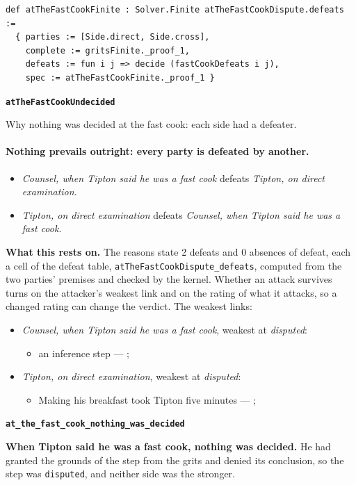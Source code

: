 \documentclass[11pt]{article}
\begin{document}
{\small\begin{verbatim}
def atTheFastCookFinite : Solver.Finite atTheFastCookDispute.defeats :=
  { parties := [Side.direct, Side.cross],
    complete := gritsFinite._proof_1,
    defeats := fun i j => decide (fastCookDefeats i j),
    spec := atTheFastCookFinite._proof_1 }
\end{verbatim}}
\par\medskip\noindent\textbf{\texttt{at\allowbreak{}The\allowbreak{}Fast\allowbreak{}Cook\allowbreak{}Undecided}}\par\nobreak\noindent
Why nothing was decided at the fast cook: each side had a defeater.

\paragraph{Nothing prevails outright: every party is defeated by another.}
\begin{itemize}
\item \emph{Counsel, when Tipton said he was a fast cook} defeats \emph{Tipton, on direct examination}.
\item \emph{Tipton, on direct examination} defeats \emph{Counsel, when Tipton said he was a fast cook}.
\end{itemize}
\par\noindent\textbf{What this rests on.} The reasons state 2 defeats and 0 absences of defeat, each a cell of the defeat table, \texttt{at\allowbreak{}The\allowbreak{}Fast\allowbreak{}Cook\allowbreak{}Dispute\_\allowbreak{}defeats}, computed from the two parties' premises and checked by the kernel. Whether an attack survives turns on the attacker's weakest link and on the rating of what it attacks, so a changed rating can change the verdict. The weakest links:
\begin{itemize}
\item \emph{Counsel, when Tipton said he was a fast cook}, weakest at \emph{disputed}:
\begin{itemize}
\item an inference step --- \cite[11--12]{garland-novato-healthcare-2019}; \cite{launer-my-cousin-vinny-1992}
\end{itemize}
\item \emph{Tipton, on direct examination}, weakest at \emph{disputed}:
\begin{itemize}
\item Making his breakfast took Tipton five minutes --- \cite[11--12]{garland-novato-healthcare-2019}; \cite{launer-my-cousin-vinny-1992}
\end{itemize}
\end{itemize}
\par\medskip\noindent\textbf{\texttt{at\_\allowbreak{}the\_\allowbreak{}fast\_\allowbreak{}cook\_\allowbreak{}nothing\_\allowbreak{}was\_\allowbreak{}decided}}\par\nobreak\noindent
\textbf{When Tipton said he was a fast cook, nothing was decided.} He had granted the grounds of the step from the grits and denied its conclusion, so the step was \texttt{disputed}, and neither side was the stronger.
\end{document}
